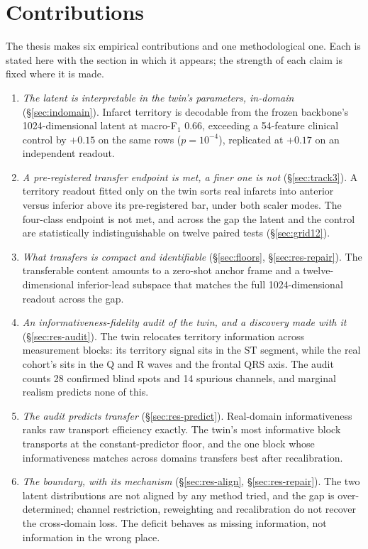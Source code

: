 \section{Contributions}
\label{sec:intro-contributions}

The thesis makes six empirical contributions and one methodological one. Each is stated here with the section in which it appears; the strength of each claim is fixed where it is made.

\begin{enumerate}[nosep]
\item \emph{The latent is interpretable in the twin's parameters, in-domain} (\S\ref{sec:indomain}). Infarct territory is decodable from the frozen backbone's 1024-dimensional latent at macro-F$_1$ 0.66, exceeding a 54-feature clinical control by $+0.15$ on the same rows ($p=10^{-4}$), replicated at $+0.17$ on an independent readout.
\item \emph{A pre-registered transfer endpoint is met, a finer one is not} (\S\ref{sec:track3}). A territory readout fitted only on the twin sorts real infarcts into anterior versus inferior above its pre-registered bar, under both scaler modes. The four-class endpoint is not met, and across the gap the latent and the control are statistically indistinguishable on twelve paired tests (\S\ref{sec:grid12}).
\item \emph{What transfers is compact and identifiable} (\S\ref{sec:floors}, \S\ref{sec:res-repair}). The transferable content amounts to a zero-shot anchor frame and a twelve-dimensional inferior-lead subspace that matches the full 1024-dimensional readout across the gap.
\item \emph{An informativeness-fidelity audit of the twin, and a discovery made with it} (\S\ref{sec:res-audit}). The twin relocates territory information across measurement blocks: its territory signal sits in the ST segment, while the real cohort's sits in the Q and R waves and the frontal QRS axis. The audit counts 28 confirmed blind spots and 14 spurious channels, and marginal realism predicts none of this.
\item \emph{The audit predicts transfer} (\S\ref{sec:res-predict}). Real-domain informativeness ranks raw transport efficiency exactly. The twin's most informative block transports at the constant-predictor floor, and the one block whose informativeness matches across domains transfers best after recalibration.
\item \emph{The boundary, with its mechanism} (\S\ref{sec:res-align}, \S\ref{sec:res-repair}). The two latent distributions are not aligned by any method tried, and the gap is over-determined; channel restriction, reweighting and recalibration do not recover the cross-domain loss. The deficit behaves as missing information, not information in the wrong place.

\end{enumerate}
